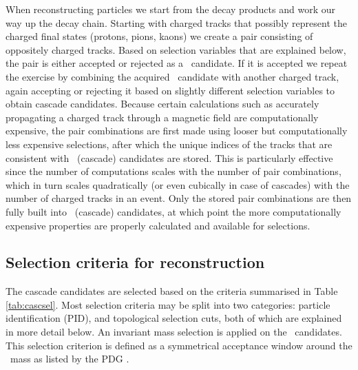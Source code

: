   When reconstructing particles we start from the decay products and work our way up the decay chain. Starting with charged tracks that possibly represent the charged final states (protons, pions, kaons) we create a pair consisting of oppositely charged tracks. Based on selection variables that are explained below, the pair is either accepted or rejected as a \Lambda\ candidate. If it is accepted we repeat the exercise by combining the acquired \Lambda\ candidate with another charged track, again accepting or rejecting it based on slightly different selection variables to obtain cascade candidates.
  Because certain calculations such as accurately propagating a charged track through a magnetic field are computationally expensive, the pair combinations are first made using looser but computationally less expensive selections, after which the unique indices of the tracks that are consistent with \Lambda\ (cascade) candidates are stored. This is particularly effective since the number of computations scales with the number of pair combinations, which in turn scales quadratically (or even cubically in case of cascades) with the number of charged tracks in an event. Only the stored pair combinations are then fully built into \Lambda\ (cascade) candidates, at which point the more computationally expensive properties are properly calculated and available for selections. 

  \subsection{Selection criteria for \texorpdfstring{\Xi}{Xi} reconstruction}

    The cascade candidates are selected based on the criteria summarised in Table \ref{tab:cascsel}. Most selection criteria may be split into two categories: particle identification (PID), and topological selection cuts, both of which are explained in more detail below. An invariant mass selection is applied on the \Lambda\ candidates. This selection criterion is defined as a symmetrical acceptance window around the \Lambda\ mass as listed by the PDG \cite{PDG2024}.


